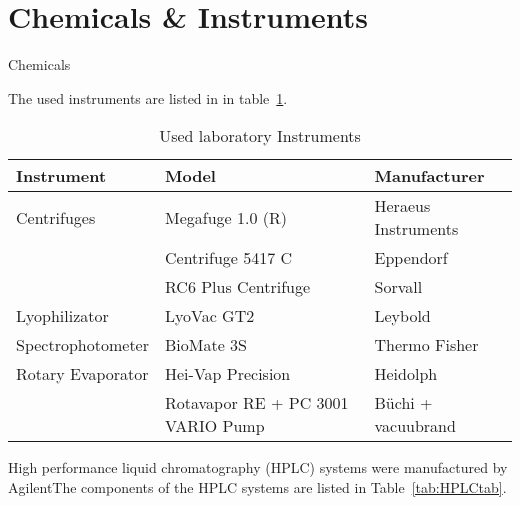 \section{Chemicals \& Instruments} %
\label{sec:chemicals_&_instruments}

Chemicals

The used instruments are listed in in table~\ref{tab:labins}.

\begin{table}[H]
	\caption{Used laboratory Instruments}
	\label{tab:labins}
	\centering
	\begin{tabularx}{\textwidth}{XXX}
		\toprule
		\textbf{Instrument}			& \textbf{Model}		& \textbf{Manufacturer}	\\
		\midrule
		Centrifuges			&	Megafuge 1.0 (R)		&	Heraeus Instruments 	\\
							&	Centrifuge 5417 C 		&	Eppendorf	\\
							&	RC6 Plus Centrifuge 	&	Sorvall	\\
		Lyophilizator		&	LyoVac GT2				&	Leybold \\
		Spectrophotometer	&	BioMate 3S				&	Thermo Fisher \\
		Rotary Evaporator	&	Hei-Vap Precision		&	Heidolph \\
							&	Rotavapor RE + PC 3001 VARIO Pump	&	B\"uchi + vacuubrand \\

		\bottomrule
	\end{tabularx}
\end{table}

High performance liquid chromatography (HPLC) systems were manufactured by AgilentThe components of the HPLC systems are listed in Table~\ref{tab:HPLCtab}.

